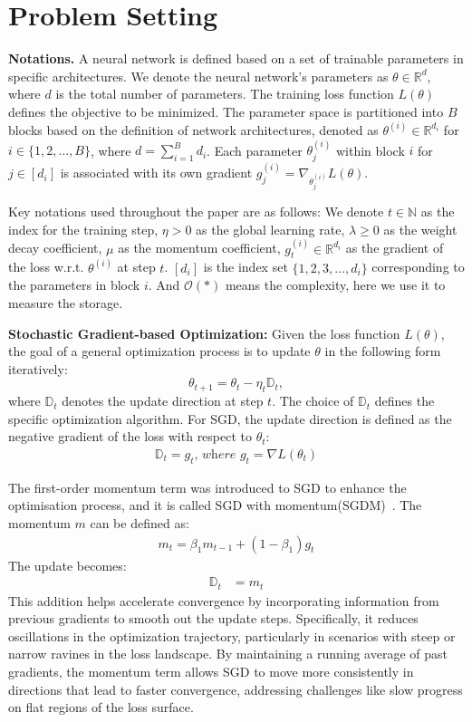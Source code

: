 \section{Problem Setting}
\textbf{Notations.} 
A neural network is defined based on a set of trainable parameters in specific architectures. We denote the neural network's parameters as $\theta \in \mathbb{R}^d$, where 
$d$ is the total number of parameters. The training loss function $L(\theta)$ defines the objective to be minimized. The parameter space is partitioned into $B$ blocks based on the definition of network architectures, denoted as $\theta^{(i)} \in \mathbb{R}^{d_i}$ for $i \in \{1, 2, \dots, B\}$, where $d = \sum_{i=1}^{B}d_i$. Each parameter $\theta^{(i)}_j$ within block $i$ for $j\in[d_i]$ is associated with its own gradient $g^{(i)}_j = \nabla_{\theta^{(i)}_j} L(\theta)$.

Key notations used throughout the paper are as follows: We denote $t\in\mathbb{N}$ as the index for the training step, $\eta > 0$ as the global learning rate, $\lambda \geq 0$ as the weight decay coefficient, $\mu$ as the momentum coefficient, $g^{(i)}_t \in \mathbb{R}^{d_i}$ as the gradient of the loss w.r.t. $\theta^{(i)}$ at step $t$. $[d_i]$ is the index set $\{1, 2, 3, \dots, d_i\}$ corresponding to the parameters in block $i$. And $\mathcal{O}(*)$ means the complexity, here we use it to measure the storage.


\textbf{Stochastic Gradient-based Optimization:} 
Given the loss function $L(\theta)$, the goal of a general optimization process is to update $\theta$ in the following form iteratively:
\begin{equation}
    \theta_{t+1} = \theta_t - \eta_t \mathbb{D}_t,
\end{equation}
where $\mathbb{D}_t$ denotes the update direction at step $t$. The choice of $\mathbb{D}_t$ defines the specific optimization algorithm. For SGD, the update direction is defined as the negative gradient of the loss with respect to $\theta_t$:
\begin{align}
    \mathbb{D}_t = g_t
    \textit{, where }
    g_t = \nabla L(\theta_t)
\end{align}

The first-order momentum term was introduced to SGD to enhance the optimisation process, and it is called SGD with momentum(SGDM)~\cite{Nes83}. The momentum $m$ can be defined as:
\begin{align}
    m_t = \beta_1 m_{t-1} + (1-\beta_1) g_t
\end{align}
The update becomes:
\begin{align}
    \mathbb{D}_t&= m_t
\end{align}
This addition helps accelerate convergence by incorporating information from previous gradients to smooth out the update steps. Specifically, it reduces oscillations in the optimization trajectory, particularly in scenarios with steep or narrow ravines in the loss landscape. By maintaining a running average of past gradients, the momentum term allows SGD to move more consistently in directions that lead to faster convergence, addressing challenges like slow progress on flat regions of the loss surface.

